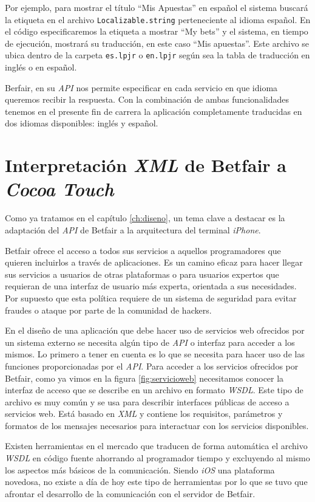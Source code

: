   
   Por ejemplo, para mostrar el título ``Mis Apuestas'' en español el sistema buscará la etiqueta en el archivo \lstinline!Localizable.string! perteneciente al idioma español. En el código especificaremos la etiqueta a mostrar ``My bets'' y el sistema, en tiempo de ejecución, mostrará su traducción, en este caso ``Mis apuestas''.  Este archivo se ubica dentro de la carpeta \lstinline!es.lpjr! o \lstinline!en.lpjr! según sea la tabla de traducción en inglés o en español. 
   
   Berfair, en su \emph{API} nos permite especificar en cada servicio en que idioma queremos recibir la respuesta. Con la combinación de ambas funcionalidades tenemos en el presente fin de carrera la aplicación completamente traducidas en dos idiomas disponibles: inglés y español. 
   
\section{Interpretación \emph{XML} de Betfair a \emph{Cocoa Touch}}
 Como ya tratamos en el capítulo \ref{ch:diseno}, un tema clave a destacar es la adaptación del \emph{API} de Betfair a la arquitectura del terminal \emph{iPhone}. 
 
  Betfair ofrece el acceso a todos sus servicios a aquellos programadores que quieren incluirlos a través de aplicaciones. Es un camino eficaz para hacer llegar sus servicios a usuarios de otras plataformas o para usuarios expertos que requieran de una interfaz de usuario más experta, orientada a sus necesidades. Por supuesto que esta política requiere de un sistema de seguridad para evitar fraudes o ataque por parte de la comunidad de hackers.
   
  En el diseño de una aplicación que debe hacer uso de servicios web ofrecidos por un sistema externo se necesita algún tipo de \emph{API} o interfaz para acceder a los mismos. Lo primero a tener en cuenta es lo que se necesita para hacer uso de las funciones proporcionadas por el \emph{API}. Para acceder a los servicios ofrecidos por Betfair, como ya vimos en la figura \ref{fig:servicioweb} necesitamos conocer la interfaz de acceso que se describe  en un archivo en formato \emph{WSDL}. Este tipo de archivo es muy común y se usa para describir interfaces públicas de acceso a servicios web. Está basado en \emph{XML} y contiene los requisitos, parámetros y formatos de los mensajes necesarios para interactuar con los servicios disponibles. 
   
   Existen herramientas en el mercado que traducen de forma automática el archivo \emph{WSDL} en código fuente ahorrando al programador tiempo y excluyendo al mismo los aspectos más básicos de la comunicación. Siendo \emph{iOS} una plataforma novedosa, no existe a día de hoy este tipo de herramientas por lo que se tuvo que afrontar el desarrollo de la comunicación con el servidor de Betfair.
      
